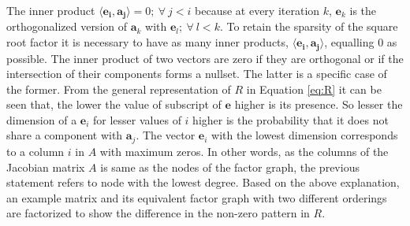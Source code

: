 The inner product $\langle \mathbf{e_i}, \mathbf{a_j} \rangle = 0; \ \forall \ j < i$ because at every iteration $k$, $\mathbf{e}_k$ is the orthogonalized version of $\mathbf{a}_k$ with $\mathbf{e}_l; \ \forall \ l < k$. To retain the sparsity of the square root factor it is necessary to have as many inner products, $\langle \mathbf{e_i}, \mathbf{a_j} \rangle$, equalling 0 as possible. The inner product of two vectors are zero if they are orthogonal or if the intersection of their components forms a nullset. The latter is a specific case of the former. From the general representation of $R$ in Equation \ref{eq:R} it can be seen that, the lower the value of subscript of $\mathbf{e}$ higher is its presence. So lesser the dimension of a $\mathbf{e}_i$ for lesser values of $i$ higher is the probability that it does not share a component with $\mathbf{a}_j$. The vector $\mathbf{e}_i$ with the lowest dimension corresponds to a column $i$ in $A$ with maximum zeros. In other words, as the columns of the Jacobian matrix $A$ is same as the nodes of the factor graph, the previous statement refers to node with the lowest degree. Based on the above explanation, an example matrix and its equivalent factor graph with two different orderings are factorized to show the difference in the non-zero pattern in $R$.
